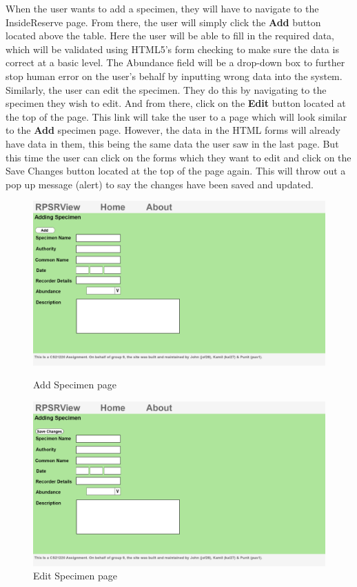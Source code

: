 \documentclass[12pt]{article}
\begin{document}
		\noindent When the user wants to add a specimen, they will have to navigate to the InsideReserve page. From there, the user will simply click the \textbf{Add} button located above the table. Here the user will be able to fill in the required data, which will be validated using HTML5's form checking to make sure the data is correct at a basic level. The Abundance field will be a drop-down box to further stop human error on the user's behalf by inputting wrong data into the system. Similarly, the user can edit the specimen. They do this by navigating to the specimen they wish to edit. And from there, click on the \textbf{Edit} button located at the top of the page. This link will take the user to a page which will look similar to the \textbf{Add} specimen page. However, the data in the HTML forms will already have data in them, this being the same data the user saw in the last page. But this time the user can click on the forms which they want to edit and click on the Save Changes button located at the top of the page again. This will throw out a pop up message (alert) to say the changes have been saved and updated.

		\begin{figure}[H]
			\begin{center}
				\includegraphics[scale=0.20]{web-AddSpecimenPLAN}
			\end{center}
			\caption{Add Specimen page}
			\label{fig:adds-page}
			\begin{center}
				\includegraphics[scale=0.20]{web-EditSpecimenPLAN}
			\end{center}
			\caption{Edit Specimen page}
			\label{fig:edits-page}
		\end{figure}
\end{document}
